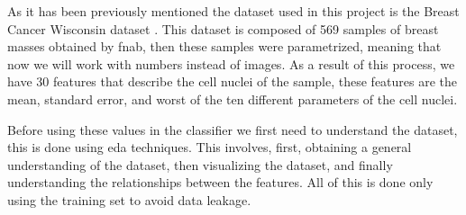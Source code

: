 As it has been previously mentioned the dataset used in this project is the Breast Cancer Wisconsin dataset \cite{william_wolberg_breast_1993}. This dataset is composed of 569 samples of breast masses obtained by \ac{fnab}, then these samples were parametrized, meaning that now we will work with numbers instead of images. As a result of this process, we have 30 features that describe the cell nuclei of the sample, these features are the mean, standard error, and 
worst 
of the ten different parameters of the cell nuclei.

Before using these values in the classifier we first need to understand the dataset, this is done using \ac{eda} techniques. This involves, first, obtaining a general understanding of the dataset, then visualizing the dataset, and finally understanding the relationships between the features. All of this is done only using the training set to avoid data leakage.

